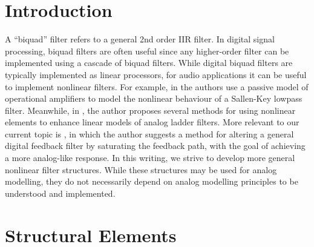 \documentclass[twoside,a4paper]{article}
\title{\papertitle}
\affiliation{
\paperauthorA \,}
{\href{http://ccrma.stanford.edu}{Center for Computer Research in Music and Acoustics} \\ Stanford University \\ Palo Alto, CA \\ {\tt \href{mailto:jatin@ccrma.stanford.edu}{jatin@ccrma.stanford.edu}}}
\newif\ifpdf
\begin{document}
\ifpdf %
  \DeclareGraphicsExtensions{.png,.jpg,.pdf}
\else  %
\fi

\maketitle

\begin{abstract}
Biquad filters are a common tool for filter design. In this
writing, we develop two structures for creating biquad filters
with nonlinear elements. We provide conditions for the guaranteed
stability of the nonlinear filters, and derive expressions for
instantaneous pole analysis. Finally, we examine example filters
built with these nonlinear structures, and show how the first
nonlinear structure can be used in the context of analog modelling.
\end{abstract}

\section{Introduction}
A ``biquad'' filter refers to a general 2nd order IIR filter.
In digital signal processing, biquad filters are often useful
since any higher-order filter can be implemented using a cascade
of biquad filters. While digital biquad filters are typically implemented
as linear processors, for audio applications it can be useful to
implement nonlinear filters. For example, in \cite{SKF} the authors
use a passive model of operational amplifiers to model the nonlinear
behaviour of a Sallen-Key lowpass filter. Meanwhile, in \cite{Vadim},
the author proposes several methods for using nonlinear elements
to enhance linear models of analog ladder filters. More relevant to
our current topic is \cite{Rossum1992MakingDF}, in which the author
suggests a method for altering a general digital feedback filter
by saturating the feedback path, with the goal of achieving a more
analog-like response. In this writing, we strive
to develop more general nonlinear filter structures. While these structures
may be used for analog modelling, they do not necessarily depend on analog
modelling principles to be understood and implemented.

\section{Structural Elements}
\end{document}
